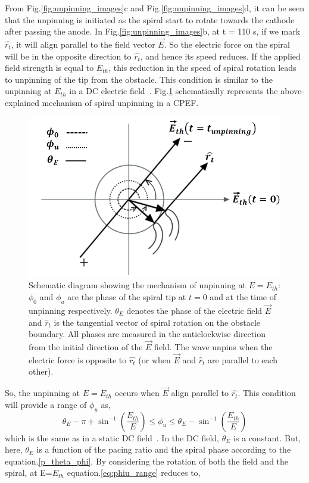 \documentclass[%
 preprint,
 amsmath,amssymb,
 aps,
]{revtex4-2}
\begin{document}
From Fig.\ref{fig:unpinning_images}c and Fig.\ref{fig:unpinning_images}d, it can be seen that the unpinning is initiated as the spiral start to rotate towards the cathode after passing the anode. 
In Fig.\ref{fig:unpinning_images}b, at t = 110 s, if we mark $\hat{r_t}$, it will align parallel to the field vector $\vec{E}$. So the electric force on the spiral will be in the opposite direction to $\hat{r_t}$, and hence its speed reduces. If the applied field strength is equal to $E_{th}$, this reduction in the speed of spiral rotation leads to unpinning of the tip from the obstacle. This condition is similar to the unpinning at $E_{th}$ in a DC electric field~\cite{dcmechanism}. Fig.\ref{fig:acw_theory} schematically represents the above-explained mechanism of spiral unpinning in a CPEF. 

\begin{figure}[H]
    \centering
    \includegraphics[width=0.8\linewidth]{theory.png}
    \caption{Schematic diagram showing the mechanism of unpinning at $E=E_{th}$: $\phi_{0}$ and  $\phi_{u}$ are the phase of the spiral tip at $t=0$ and at the time of unpinning respectively. $\theta_{E}$ denotes the phase of the electric field ${\vec{E}}$ and ${\hat{r}}_{t}$ is the tangential vector of spiral rotation on the obstacle boundary. All phases are measured in the anticlockwise direction from the initial direction of the $\vec{E}$ field. The wave unpins when the electric force is opposite to $\hat{r_t}$ (or when ${\vec{E}}$ and ${\hat{r}}_{t}$ are parallel to each other).
    }
    
    \label{fig:acw_theory}
\end{figure}

So, the unpinning at $E=E_{th}$ occurs when $\vec{E}$ align parallel to $\hat{r_t}$. This condition will provide a range of $\phi_{u}$ as,
 \begin{equation}
\theta_{E} - \pi + {\sin^{-1}} (\frac{E_{th}}{E})  \leq \phi_u \leq \theta_{E}-{\sin^{-1}} (\frac{E_{th}}{E}) 
\label{eq:phiu_range}
\end{equation}
which is the same as in a static DC field~\cite{dcmechanism}. In the DC field, $\theta_{E}$ is a constant.
But, here, $\theta_{E}$ is a function of the pacing ratio and the spiral phase according to the equation.\ref{p_theta_phi}. 
By considering the rotation of both the field and the spiral, at E=$E_{th}$ equation.\ref{eq:phiu_range} reduces to, 
\end{document}

